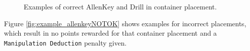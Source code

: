 \begin{figure}[h!]
	\begin{center}
		 \hfill
		 \hfill
		 \hfill
		 \hfill
	\end{center}
	\caption{Examples of correct AllenKey and Drill in container placement.}
	\label{fig:example_allenkeyOK}
\end{figure}

Figure \ref{fig:example_allenkeyNOTOK} shows examples for incorrect placements, which result in no points rewarded for that container placement and a \texttt{Manipulation Deduction} penalty given.


